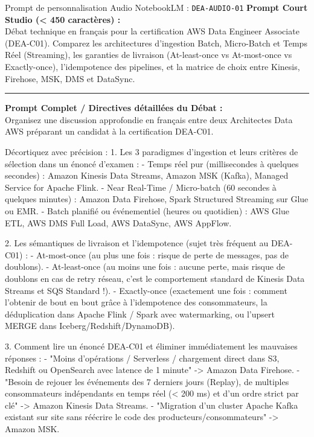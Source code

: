 \documentclass[11pt,a4paper]{article}
\begin{document}
\begin{promptbox}{Prompt de personnalisation Audio NotebookLM : \texttt{DEA-AUDIO-01}}
\textbf{Prompt Court Studio (< 450 caractères) :}\\
Débat technique en français pour la certification AWS Data Engineer Associate (DEA-C01). Comparez les architectures d'ingestion Batch, Micro-Batch et Temps Réel (Streaming), les garanties de livraison (At-least-once vs At-most-once vs Exactly-once), l'idempotence des pipelines, et la matrice de choix entre Kinesis, Firehose, MSK, DMS et DataSync.

\medskip\hrule\medskip
\textbf{Prompt Complet / Directives détaillées du Débat :}\\
Organisez une discussion approfondie en français entre deux Architectes Data AWS préparant un candidat à la certification DEA-C01.

Décortiquez avec précision :
1. Les 3 paradigmes d'ingestion et leurs critères de sélection dans un énoncé d'examen :
- Temps réel pur (millisecondes à quelques secondes) : Amazon Kinesis Data Streams, Amazon MSK (Kafka), Managed Service for Apache Flink.
- Near Real-Time / Micro-batch (60 secondes à quelques minutes) : Amazon Data Firehose, Spark Structured Streaming sur Glue ou EMR.
- Batch planifié ou événementiel (heures ou quotidien) : AWS Glue ETL, AWS DMS Full Load, AWS DataSync, AWS AppFlow.

2. Les sémantiques de livraison et l'idempotence (sujet très fréquent au DEA-C01) :
- At-most-once (au plus une fois : risque de perte de messages, pas de doublons).
- At-least-once (au moins une fois : aucune perte, mais risque de doublons en cas de retry réseau, c'est le comportement standard de Kinesis Data Streams et SQS Standard !).
- Exactly-once (exactement une fois : comment l'obtenir de bout en bout grâce à l'idempotence des consommateurs, la déduplication dans Apache Flink / Spark avec watermarking, ou l'upsert MERGE dans Iceberg/Redshift/DynamoDB).

3. Comment lire un énoncé DEA-C01 et éliminer immédiatement les mauvaises réponses :
- "Moins d'opérations / Serverless / chargement direct dans S3, Redshift ou OpenSearch avec latence de 1 minute" -> Amazon Data Firehose.
- "Besoin de rejouer les événements des 7 derniers jours (Replay), de multiples consommateurs indépendants en temps réel (< 200 ms) et d'un ordre strict par clé" -> Amazon Kinesis Data Streams.
- "Migration d'un cluster Apache Kafka existant sur site sans réécrire le code des producteurs/consommateurs" -> Amazon MSK.
\end{promptbox}
\end{document}
